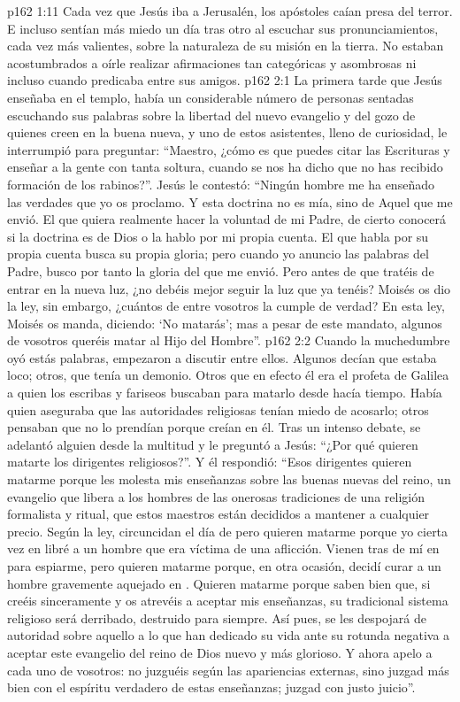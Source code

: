 \vs p162 1:11 Cada vez que Jesús iba a Jerusalén, los apóstoles caían presa del terror. E incluso sentían más miedo un día tras otro al escuchar sus pronunciamientos, cada vez más valientes, sobre la naturaleza de su misión en la tierra. No estaban acostumbrados a oírle realizar afirmaciones tan categóricas y asombrosas ni incluso cuando predicaba entre sus amigos.
\vs p162 2:1 La primera tarde que Jesús enseñaba en el templo, había un considerable número de personas sentadas escuchando sus palabras sobre la libertad del nuevo evangelio y del gozo de quienes creen en la buena nueva, y uno de estos asistentes, lleno de curiosidad, le interrumpió para preguntar: “Maestro, ¿cómo es que puedes citar las Escrituras y enseñar a la gente con tanta soltura, cuando se nos ha dicho que no has recibido formación de los rabinos?”. Jesús le contestó: “Ningún hombre me ha enseñado las verdades que yo os proclamo. Y esta doctrina no es mía, sino de Aquel que me envió. El que quiera realmente hacer la voluntad de mi Padre, de cierto conocerá si la doctrina es de Dios o la hablo por mi propia cuenta. El que habla por su propia cuenta busca su propia gloria; pero cuando yo anuncio las palabras del Padre, busco por tanto la gloria del que me envió. Pero antes de que tratéis de entrar en la nueva luz, ¿no debéis mejor seguir la luz que ya tenéis? Moisés os dio la ley, sin embargo, ¿cuántos de entre vosotros la cumple de verdad? En esta ley, Moisés os manda, diciendo: ‘No matarás’; mas a pesar de este mandato, algunos de vosotros queréis matar al Hijo del Hombre”.
\vs p162 2:2 \pc Cuando la muchedumbre oyó estás palabras, empezaron a discutir entre ellos. Algunos decían que estaba loco; otros, que tenía un demonio. Otros que en efecto él era el profeta de Galilea a quien los escribas y fariseos buscaban para matarlo desde hacía tiempo. Había quien aseguraba que las autoridades religiosas tenían miedo de acosarlo; otros pensaban que no lo prendían porque creían en él. Tras un intenso debate, se adelantó alguien desde la multitud y le preguntó a Jesús: “¿Por qué quieren matarte los dirigentes religiosos?”. Y él respondió: “Esos dirigentes quieren matarme porque les molesta mis enseñanzas sobre las buenas nuevas del reino, un evangelio que libera a los hombres de las onerosas tradiciones de una religión formalista y ritual, que estos maestros están decididos a mantener a cualquier precio. Según la ley, circuncidan el día de  pero quieren matarme porque yo cierta vez en  libré a un hombre que era víctima de una aflicción. Vienen tras de mí en  para espiarme, pero quieren matarme porque, en otra ocasión, decidí curar a un hombre gravemente aquejado en . Quieren matarme porque saben bien que, si creéis sinceramente y os atrevéis a aceptar mis enseñanzas, su tradicional sistema religioso será derribado, destruido para siempre. Así pues, se les despojará de autoridad sobre aquello a lo que han dedicado su vida ante su rotunda negativa a aceptar este evangelio del reino de Dios nuevo y más glorioso. Y ahora apelo a cada uno de vosotros: no juzguéis según las apariencias externas, sino juzgad más bien con el espíritu verdadero de estas enseñanzas; juzgad con justo juicio”.

